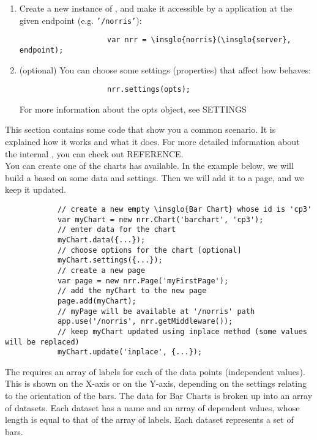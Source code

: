 \begin{itemize}
\begin{enumerate}
\begin{lstlisting}
				\end{lstlisting}
				\item Create a new instance of , and make it accessible by a  application at the given endpoint (e.g. \texttt{'/norris'}):
				\begin{lstlisting}
					var nrr = \insglo{norris}(\insglo{server}, endpoint);
				\end{lstlisting}
				\item (optional) You can choose some settings (properties) that affect how  behaves:
				\begin{lstlisting}
					nrr.settings(opts);
				\end{lstlisting}
				For more information about the opts object, see  SETTINGS
			\end{enumerate}
		\end{itemize}
		This section contains some code that show you a common scenario. It is explained how it works and what it does. For more detailed information about the internal , you can check out  REFERENCE.\\
		You can create one of the charts  has available. In the example below, we will build a  based on some data and settings. Then we will add it to a page, and we keep it updated.
		\begin{lstlisting}
			// create a new empty \insglo{Bar Chart} whose id is 'cp3'
			var myChart = new nrr.Chart('barchart', 'cp3');
			// enter data for the chart
			myChart.data({...});
			// choose options for the chart [optional]
			myChart.settings({...});
			// create a new page
			var page = new nrr.Page('myFirstPage');
			// add the myChart to the new page
			page.add(myChart);
			// myPage will be available at '/norris' path
			app.use('/norris', nrr.getMiddleware());
			// keep myChart updated using inplace method (some values will be replaced)
			myChart.update('inplace', {...});
		\end{lstlisting}
			The  requires an array of labels for each of the data points (independent values). This is shown on the X-axis or on the Y-axis, depending on the settings relating to the orientation of the bars. The data for Bar Charts is broken up into an array of datasets. Each dataset has a name and an array of dependent values, whose length is equal to that of the array of labels. Each dataset represents a set of bars.\\
